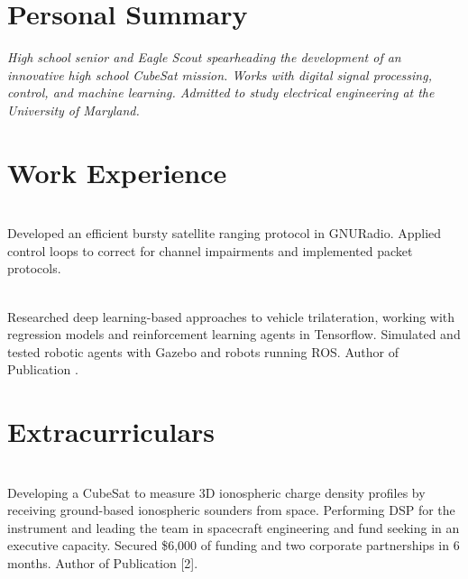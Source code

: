 \documentclass[]{deedy-resume-openfont}
\begin{document}
\begin{minipage}[t]{0.66\textwidth} 

\section{Personal Summary}

\textit{High school senior and Eagle Scout spearheading the development of an innovative high school CubeSat mission. Works with digital signal processing, control, and machine learning. Admitted to study electrical engineering at the University of Maryland.}

\sectionsep
\section{Work Experience}

\vspace{0.125cm}

 \\
Developed an efficient bursty satellite ranging protocol in GNURadio. Applied control loops to correct for channel impairments and implemented packet protocols.
\sectionsep

 \\
Researched deep learning-based approaches to vehicle trilateration, working with regression models and reinforcement learning agents in Tensorflow. Simulated and tested robotic agents with Gazebo and robots running ROS. Author of Publication \cite{lps}.

\sectionsep

\section{Extracurriculars}

\vspace{0.125cm}

 \\
Developing a CubeSat to measure 3D ionospheric charge density profiles by receiving ground-based ionospheric sounders from space. Performing DSP for the instrument and leading the team in spacecraft engineering and fund seeking in an executive capacity. Secured \$6,000 of funding and two corporate partnerships in 6 months. Author of Publication [2].
\sectionsep


\end{minipage}
\end{document}
